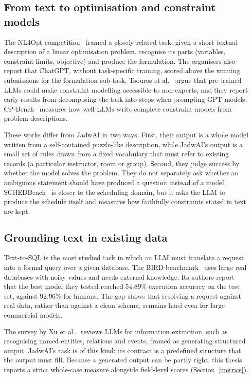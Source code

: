 \subsection{From text to optimisation and constraint models}
The NL4Opt competition~\cite{ramamonjison2023nl4opt} framed a closely related task: given a short textual description of a linear optimisation problem, recognise its parts (variables, constraint limits, objective) and produce the formulation. The organisers also report that ChatGPT, without task-specific training, scored above the winning submissions for the formulation sub-task. Tsouros et al.~\cite{tsouros2023holygrail} argue that pre-trained LLMs could make constraint modelling accessible to non-experts, and they report early results from decomposing the task into steps when prompting GPT models. CP-Bench~\cite{michailidis2025cpbench} measures how well LLMs write complete constraint models from problem descriptions.

These works differ from JadwAI in two ways. First, their output is a whole model written from a self-contained puzzle-like description, while JadwAI's output is a small set of rules drawn from a fixed vocabulary that must refer to existing records (a particular instructor, room or group). Second, they judge success by whether the model solves the problem. They do not separately ask whether an ambiguous statement should have produced a question instead of a model. SCHEDBench~\cite{sharma2026schedbench} is closer to the scheduling domain, but it asks the LLM to produce the schedule itself and measures how faithfully constraints stated in text are kept.

\subsection{Grounding text in existing data}
Text-to-SQL is the most studied task in which an LLM must translate a request into a formal query over a given database. The BIRD benchmark~\cite{li2023bird} uses large real databases with noisy values and needs external knowledge. Its authors report that the best model they tested reached 54.89\% execution accuracy on the test set, against 92.96\% for humans. The gap shows that resolving a request against real data, rather than against a clean schema, remains hard even for large commercial models.

The survey by Xu et al.~\cite{xu2024generativeie} reviews LLMs for information extraction, such as recognising named entities, relations and events, framed as generating structured output. JadwAI's task is of this kind: its contract is a predefined structure that the output must fill. Because a generated output can be partly right, this thesis reports a strict whole-case measure alongside field-level scores (Section~\ref{metrics}).

